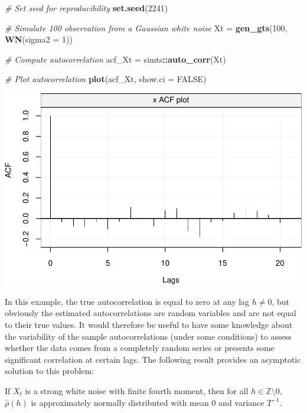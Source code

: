\documentclass[]{book}
\newenvironment{Shaded}{\begin{snugshade}}{\end{snugshade}}
\newcommand{\KeywordTok}[1]{\textcolor[rgb]{0.13,0.29,0.53}{\textbf{#1}}}
\newcommand{\DataTypeTok}[1]{\textcolor[rgb]{0.13,0.29,0.53}{#1}}
\newcommand{\DecValTok}[1]{\textcolor[rgb]{0.00,0.00,0.81}{#1}}
\newcommand{\StringTok}[1]{\textcolor[rgb]{0.31,0.60,0.02}{#1}}
\newcommand{\CommentTok}[1]{\textcolor[rgb]{0.56,0.35,0.01}{\textit{#1}}}
\newcommand{\OtherTok}[1]{\textcolor[rgb]{0.56,0.35,0.01}{#1}}
\newcommand{\OperatorTok}[1]{\textcolor[rgb]{0.81,0.36,0.00}{\textbf{#1}}}
\newcommand{\NormalTok}[1]{#1}
\theoremstyle{definition}
\theoremstyle{definition}
\theoremstyle{definition}
\theoremstyle{remark}
\let\BeginKnitrBlock\begin \let\EndKnitrBlock\end
\begin{document}
\begin{Shaded}
\begin{Highlighting}[]
\CommentTok{# Set seed for reproducibility}
\KeywordTok{set.seed}\NormalTok{(}\DecValTok{2241}\NormalTok{)}

\CommentTok{# Simulate 100 observation from a Gaussian white noise}
\NormalTok{Xt =}\StringTok{ }\KeywordTok{gen_gts}\NormalTok{(}\DecValTok{100}\NormalTok{, }\KeywordTok{WN}\NormalTok{(}\DataTypeTok{sigma2 =} \DecValTok{1}\NormalTok{))}

\CommentTok{# Compute autocorrelation}
\NormalTok{acf_Xt =}\StringTok{ }\NormalTok{simts}\OperatorTok{::}\KeywordTok{auto_corr}\NormalTok{(Xt)}

\CommentTok{# Plot autocorrelation}
\KeywordTok{plot}\NormalTok{(acf_Xt, }\DataTypeTok{show.ci =} \OtherTok{FALSE}\NormalTok{)}
\end{Highlighting}
\end{Shaded}

\includegraphics{ts_files/figure-latex/basicACF-1.pdf}

In this example, the true autocorrelation is equal to zero at any lag
\(h \neq 0\), but obviously the estimated autocorrelations are random
variables and are not equal to their true values. It would therefore be
useful to have some knowledge about the variability of the sample
autocorrelations (under some conditions) to assess whether the data
comes from a completely random series or presents some significant
correlation at certain lags. The following result provides an asymptotic
solution to this problem:

\BeginKnitrBlock{theorem}
\protect\hypertarget{thm:approxnormal}{}{\label{thm:approxnormal} }If
\(X_t\) is a strong white noise with finite fourth moment, then for all
\(h \in \mathbb{Z} \setminus {0}\), \(\hat{\rho}(h)\) is approximately
normally distributed with mean \(0\) and variance \(T^{-1}\).
\EndKnitrBlock{theorem}
\end{document}
